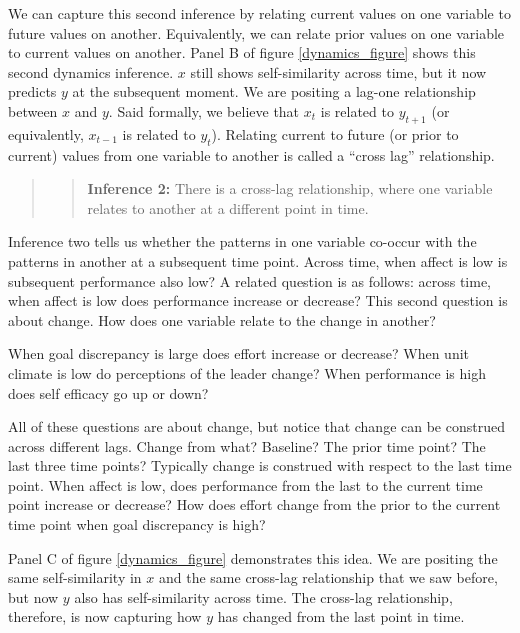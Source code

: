 \documentclass[english,,man]{apa6}
\theoremstyle{definition}
\theoremstyle{definition}
\theoremstyle{definition}
\theoremstyle{remark}
\begin{document}
We can capture this second inference by relating current values on one
variable to future values on another. Equivalently, we can relate prior
values on one variable to current values on another. Panel B of figure
\ref{dynamics_figure} shows this second dynamics inference. \(x\) still
shows self-similarity across time, but it now predicts \(y\) at the
subsequent moment. We are positing a lag-one relationship between \(x\)
and \(y\). Said formally, we believe that \(x_t\) is related to
\(y_{t+1}\) (or equivalently, \(x_{t-1}\) is related to \(y_{t}\)).
Relating current to future (or prior to current) values from one
variable to another is called a \enquote{cross lag} relationship.

\begin{quote}
\begin{quote}
\textbf{Inference 2:} There is a cross-lag relationship, where one
variable relates to another at a different point in time.
\end{quote}
\end{quote}

Inference two tells us whether the patterns in one variable co-occur
with the patterns in another at a subsequent time point. Across time,
when affect is low is subsequent performance also low? A related
question is as follows: across time, when affect is low does performance
increase or decrease? This second question is about change. How does one
variable relate to the change in another?

When goal discrepancy is large does effort increase or decrease? When
unit climate is low do perceptions of the leader change? When
performance is high does self efficacy go up or down?

All of these questions are about change, but notice that change can be
construed across different lags. Change from what? Baseline? The prior
time point? The last three time points? Typically change is construed
with respect to the last time point. When affect is low, does
performance from the last to the current time point increase or
decrease? How does effort change from the prior to the current time
point when goal discrepancy is high?

Panel C of figure \ref{dynamics_figure} demonstrates this idea. We are
positing the same self-similarity in \(x\) and the same cross-lag
relationship that we saw before, but now \(y\) also has self-similarity
across time. The cross-lag relationship, therefore, is now capturing how
\(y\) has changed from the last point in time.
\end{document}
